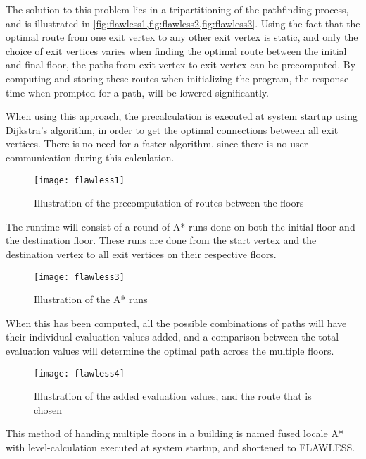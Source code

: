 The solution to this problem lies in a tripartitioning of the pathfinding process, and is illustrated in \cref{fig:flawless1,fig:flawless2,fig:flawless3}. Using the fact that the optimal route from one exit vertex to any other exit vertex is static, and only the choice of exit vertices varies when finding the optimal route between the initial and final floor, the paths from exit vertex to exit vertex can be precomputed. By computing and storing these routes when initializing the program, the response time when prompted for a path, will be lowered significantly.

When using this approach, the precalculation is executed at system startup using Dijkstra's algorithm, in order to get the optimal connections between all exit vertices. There is no need for a faster algorithm, since there is no user communication during this calculation.

%

\begin{figure}[ht!]
    \centering
    \texttt{[image: flawless1]}
    \caption{Illustration of the precomputation of routes between the floors}
    \label{fig:flawless1}
  \end{figure}

The runtime will consist of a round of A* runs done on both the initial floor and the destination floor. These runs are done from the start vertex and the destination vertex to all exit vertices on their respective floors. 

\begin{figure}[ht!]
    \centering
    \texttt{[image: flawless3]}
    \caption{Illustration of the A* runs}
    \label{fig:flawless2}
  \end{figure}

When this has been computed, all the possible combinations of paths will have their individual evaluation values added, and a comparison between the total evaluation values will determine the optimal path across the multiple floors. 

\begin{figure}[ht!]
    \centering
    \texttt{[image: flawless4]}
    \caption{Illustration of the added evaluation values, and the route that is chosen}
    \label{fig:flawless3}
  \end{figure}

This method of handing multiple floors in a building is named fused locale A* with level-calculation executed at system startup, and shortened to FLAWLESS.


